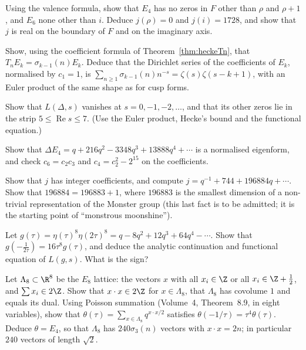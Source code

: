 \begin{exercise}[$\star$]\label{ex:jvalues}
Using the valence formula, show that $E_4$ has no zeros in $F$ other than $\rho$ and $\rho+1$, and $E_6$ none other than $i$. Deduce $j(\rho)=0$ and $j(i)=1728$, and show
that $j$ is real on the boundary of $F$ and on the imaginary axis.
\end{exercise}

\begin{exercise}[$\star$]\label{ex:eisenhecke}
Show, using the coefficient formula of Theorem~\ref{thm:heckeTn}, that $T_nE_k=\sigma_{k-1}(n)E_k$. Deduce that the Dirichlet series of the coefficients of
$E_k$, normalised by $c_1=1$, is $\sum_{n\ge1}\sigma_{k-1}(n)n^{-s}=\zeta(s)\zeta(s-k+1)$, with an Euler product of the same shape as for cusp forms.
\end{exercise}

\begin{exercise}[$\star$]\label{ex:trivialzeros}
Show that $L(\Delta,s)$ vanishes at $s=0,-1,-2,\dots$, and that its other zeros lie in the strip $5\le\operatorname{Re}s\le7$. (Use the
Euler product, Hecke's bound and the functional equation.)
\end{exercise}

\begin{exercise}[$\star\star$]\label{ex:deltae4}
Show that $\Delta E_4=q+216q^2-3348q^3+13888q^4+\cdots$ is a normalised eigenform, and check $c_6=c_2c_3$ and $c_4=c_2^2-2^{15}$ on the coefficients.
\end{exercise}

\begin{exercise}[$\star\star$]\label{ex:jint}
Show that $j$ has integer coefficients, and compute $j=q^{-1}+744+196884q+\cdots$. Show that $196884=196883+1$, where $196883$ is the smallest dimension of a non-trivial
representation of the Monster group (this last fact is to be admitted; it is the starting point of ``monstrous moonshine'').
\end{exercise}

\begin{exercise}[$\star\star$]\label{ex:level2}
Let $g(\tau)=\eta(\tau)^8\eta(2\tau)^8=q-8q^2+12q^3+64q^4-\cdots$. Show that $g(-\frac1{2\tau})=16\tau^8g(\tau)$, and deduce the analytic continuation and functional equation
of $L(g,s)$. What is the sign?
\end{exercise}

\begin{exercise}[$\star\star\star$]\label{ex:e8theta}
Let $\Lambda_8\subset\R^8$ be the $E_8$ lattice: the vectors $x$ with all $x_i\in\Z$ or all $x_i\in\Z+\frac12$, and $\sum x_i\in2\Z$. Show that $x\cdot x\in2\Z$ for
$x\in\Lambda_8$, that $\Lambda_8$ has covolume $1$ and equals its dual. Using Poisson summation (Volume~4, Theorem~8.9, in eight variables), show that
$\theta(\tau)=\sum_{x\in\Lambda_8}q^{x\cdot x/2}$ satisfies $\theta(-1/\tau)=\tau^4\theta(\tau)$. Deduce $\theta=E_4$, so that $\Lambda_8$ has $240\sigma_3(n)$ vectors with
$x\cdot x=2n$; in particular $240$ vectors of length $\sqrt2$.
\end{exercise}

